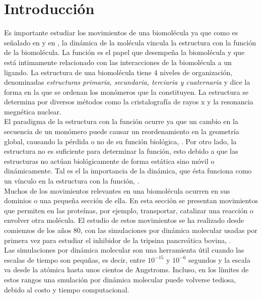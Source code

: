 \chapter*{Introducci\'{o}n}
Es importante estudiar los movimientos de una biomol\'{e}cula ya que como es se\~{n}alado en \cite{Lezon2009} y en  \cite{Rader2006}, la din\'{a}mica de la mol\'{e}cula vincula la estructura con la funci\'{o}n de la biomol\'{e}cula. La funci\'{o}n es el papel que desempe\~{n}a la biomol\'{e}cula y que est\'{a} intimamente relacionado con las interacciones de la biomol\'{e}cula a un ligando. La estructura de una biomol\'{e}cula tiene 4 niveles de organizaci\'{o}n, denominadas \textit{estructuras primaria, secundaria, terciaria y cuaternaria} y dice la forma en la que se ordenan los mon\'{o}meros que la constituyen. La estructura se determina por diversos m\'{e}todos como la cristalograf\'{i}a de rayos x y la resonancia megn\'{e}tica nuclear.\\


El paradigma de la estructura con la funci\'{o}n ocurre ya que un cambio en la secuencia de un mon\'{o}mero puede causar un reordenamiento en la geometr\'{i}a global, causando la p\'{e}rdida o no de su funci\'{o}n biol\'{o}gica, \cite{Dykeman2010NormalPhysics}. Por otro lado, la estructura no es suficiente para determinar la funci\'{o}n, esto debido a que las estructuras no act\'{u}an biol\'{o}gicamente de forma est\'{a}tica sino m\'{o}vil o din\'{a}micamente. Tal es el la importancia de la din\'{a}mica, que \'{e}sta funciona como un v\'{i}nculo en la estructura con la funci\'{o}n, \cite{Bahar2005Coarse-grainedBiology}.\\


Muchos de los movimientos relevantes en una biomol\'{e}cula ocurren en sus dominios o una peque\~{n}a secci\'{o}n de ella. En esta secci\'{o}n se presentan movimientos que 
permiten en las prote\'{i}nas, por ejemplo, transportar, catalizar una reacci\'{o}n o envolver otra mol\'{e}cula. El estudio de estos movimientos se ha realizado desde comienzos de los a\~{n}os 80, con las simulaciones por din\'{a}mica molecular usadas por primera vez para estudiar el inhibidor de la tripsina pancre\'{a}tica bovina,  \cite{Bahar2005Coarse-grainedBiology}.\\

Las simulaciones por din\'{a}mica molecular son una herramienta \'{u}til cuando las escalas de tiempo son pequ\~{n}as, es decir, entre $10^{-15}$ y  $10^{-6}$ segundos y la escala va desde la at\'{o}mica hasta unos cientos de Angstroms. Incluso, en los l\'{i}mites de estos rangos una smulaci\'{o}n por din\'{a}mica molecular puede volverse tediosa, debido al costo y tiempo computacional.\\

